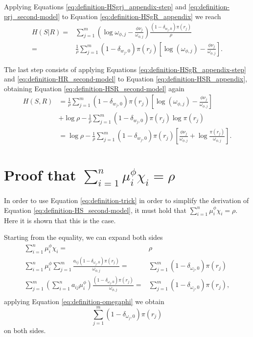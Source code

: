 Applying Equations \eqref{eq:definition-HSgrj_appendix-step} and \eqref{eq:definition-prj_second-model} to Equation \eqref{eq:definition-HSgR_appendix} we reach
\begin{align}
  H(S|R) =& \sum_{j=1}^m \left(\log \omega_{\phi,j} - \frac{\phi \nu_j}{\omega_{\phi,j}}\right) \frac{(1 - \delta_{w_j,0}) \pi(r_j)}{\rho} \nonumber \\
  \label{eq:definition-HSgR_appendix-step}
       =& \frac{1}{\rho} \sum_{j=1}^m (1 - \delta_{w_j,0}) \pi(r_j) \left[ \log(\omega_{\phi,j}) - \frac{\phi \nu_j}{\omega_{\phi,j}} \right].
\end{align}

The last step consists of applying Equations \eqref{eq:definition-HSgR_appendix-step} and \eqref{eq:definition-HR_second-model} to Equation \eqref{eq:definition-HSR_appendix}, obtaining Equation \eqref{eq:definition-HSR_second-model} again
\begin{align*}
  H(S,R) &= \frac{1}{\rho} \sum_{j=1}^m (1 - \delta_{w_j,0}) \pi(r_j) \left[ \log(\omega_{\phi,j}) - \frac{\phi \nu_j}{\omega_{\phi,j}} \right] \\
       &+ \log \rho - \frac{1}{\rho} \sum_{j=1}^m (1 - \delta_{w_j,0}) \pi(r_j) \log \pi(r_j) \\
       &= \log \rho - \frac{1}{\rho} \sum_{j=1}^m (1 - \delta_{w_j,0}) \pi(r_j) \left[ \frac{\phi \nu_j}{\omega_{\phi,j}} + \log \frac{\pi(r_j)}{\omega_{\phi,j}} \right].
\end{align*}

\section{Proof that $\sum_{i=1}^n \mu_i^\phi \chi_i = \rho$}
\label{sec:app_formulae_proof-sum-HS_second-model}

In order to use Equation \eqref{eq:definition-trick} in order to simplify the derivation of Equation \eqref{eq:definition-HS_second-model}, it must hold that $\sum_{i=1}^n \mu_i^\phi \chi_i = \rho$.
Here it is shown that this is the case.

Starting from the equality, we can expand both sides
\begin{align*}
\sum_{i=1}^n \mu_i^\phi \chi_i =& \rho \\
\sum_{i=1}^n \mu_i^\phi \sum_{j=1}^m \frac{a_{ij} (1 - \delta_{\omega_j,0}) \pi(r_j)}{\omega_{\phi,j}} =& \sum_{j=1}^m (1 - \delta_{\omega_j,0}) \pi(r_j) \\
\sum_{j=1}^m \left( \sum_{i=1}^n a_{ij} \mu_i^\phi \right) \frac{(1 - \delta_{\omega_j,0}) \pi(r_j)}{\omega_{\phi,j}} =& \sum_{j=1}^m (1 - \delta_{\omega_j,0}) \pi(r_j), \\
\end{align*}
applying Equation \eqref{eq:definition-omegaphi} we obtain
\begin{equation*}
  \sum_{j=1}^m (1 - \delta_{\omega_j,0}) \pi(r_j)
\end{equation*}
on both sides.

